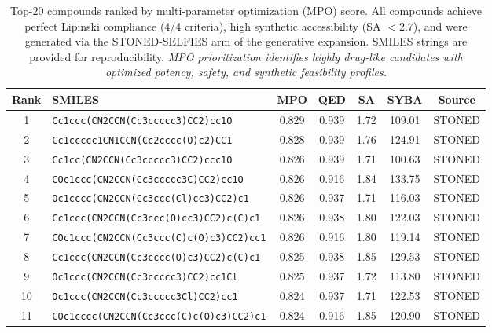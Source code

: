 \documentclass[journal=jcisd8,manuscript=suppinfo]{achemso}
\begin{document}
\begin{table}[htbp]
\centering
\caption{Top-20 compounds ranked by multi-parameter optimization (MPO) score. All compounds achieve perfect Lipinski compliance (\num{4}/\num{4} criteria), high synthetic accessibility (SA $< \num{2.7}$), and were generated via the STONED-SELFIES arm of the generative expansion. SMILES strings are provided for reproducibility. \textit{MPO prioritization identifies highly drug-like candidates with optimized potency, safety, and synthetic feasibility profiles.}}
\label{tab:top20_mpo}
\small
\begin{tabular}{@{}c p{6cm} c c c c c@{}}
\toprule
\textbf{Rank} & \textbf{SMILES} & \textbf{MPO} & \textbf{QED} & \textbf{SA} & \textbf{SYBA} & \textbf{Source} \\
\midrule
\num{1} & \texttt{Cc1ccc(CN2CCN(Cc3ccccc3)CC2)cc1O} & \num{0.829} & \num{0.939} & \num{1.72} & \num{109.01} & STONED \\
\num{2} & \texttt{Cc1ccccc1CN1CCN(Cc2cccc(O)c2)CC1} & \num{0.828} & \num{0.939} & \num{1.76} & \num{124.91} & STONED \\
\num{3} & \texttt{Cc1cc(CN2CCN(Cc3ccccc3)CC2)ccc1O} & \num{0.826} & \num{0.939} & \num{1.71} & \num{100.63} & STONED \\
\num{4} & \texttt{COc1ccc(CN2CCN(Cc3ccccc3C)CC2)cc1O} & \num{0.826} & \num{0.916} & \num{1.84} & \num{133.75} & STONED \\
\num{5} & \texttt{Oc1cccc(CN2CCN(Cc3ccc(Cl)cc3)CC2)c1} & \num{0.826} & \num{0.937} & \num{1.71} & \num{116.03} & STONED \\
\num{6} & \texttt{Cc1ccc(CN2CCN(Cc3ccc(O)cc3)CC2)c(C)c1} & \num{0.826} & \num{0.938} & \num{1.80} & \num{122.03} & STONED \\
\num{7} & \texttt{COc1ccc(CN2CCN(Cc3ccc(C)c(O)c3)CC2)cc1} & \num{0.826} & \num{0.916} & \num{1.80} & \num{119.14} & STONED \\
\num{8} & \texttt{Cc1ccc(CN2CCN(Cc3cccc(O)c3)CC2)c(C)c1} & \num{0.825} & \num{0.938} & \num{1.85} & \num{129.53} & STONED \\
\num{9} & \texttt{Oc1ccc(CN2CCN(Cc3ccccc3)CC2)cc1Cl} & \num{0.825} & \num{0.937} & \num{1.72} & \num{113.80} & STONED \\
\num{10} & \texttt{Oc1ccc(CN2CCN(Cc3ccccc3Cl)CC2)cc1} & \num{0.824} & \num{0.937} & \num{1.71} & \num{122.53} & STONED \\
\num{11} & \texttt{COc1cccc(CN2CCN(Cc3ccc(C)c(O)c3)CC2)c1} & \num{0.824} & \num{0.916} & \num{1.85} & \num{120.90} & STONED \\

\end{tabular}
\end{table}
\end{document}
